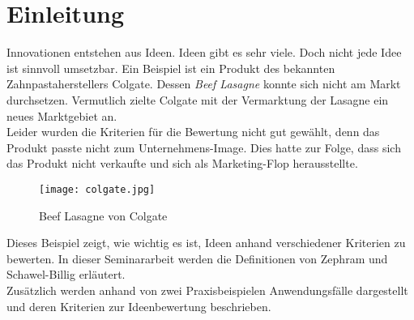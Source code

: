 \section{Einleitung}\label{sec:einleitung}
Innovationen entstehen aus Ideen. Ideen gibt es sehr viele. Doch nicht jede Idee ist sinnvoll umsetzbar.
Ein Beispiel ist ein Produkt des bekannten Zahnpastaherstellers Colgate. 
Dessen \textit{Beef Lasagne} konnte sich nicht am Markt durchsetzen. 
Vermutlich zielte Colgate mit der Vermarktung der Lasagne ein neues Marktgebiet an. \\
Leider wurden die Kriterien für die Bewertung nicht gut gewählt, denn das Produkt passte nicht zum Unternehmens-Image.
Dies hatte zur Folge, dass sich das Produkt nicht verkaufte und sich als Marketing-Flop herausstellte.
\begin{figure}[h]
	\centering
	\texttt{[image: colgate.jpg]}
	\caption{Beef Lasagne von Colgate}
	\label{img:colgate}
\end{figure}
Dieses Beispiel zeigt, wie wichtig es ist, Ideen anhand verschiedener Kriterien zu bewerten. 
In dieser Seminararbeit werden die Definitionen von Zephram und Schawel-Billig erläutert. \\
Zusätzlich werden anhand 
von zwei Praxisbeispielen Anwendungsfälle dargestellt und deren Kriterien zur Ideenbewertung beschrieben.